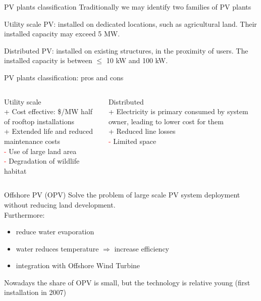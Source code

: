 \documentclass[aspectratio=169, 12pt]{beamer}
\begin{document}
\begin{frame}{PV plants classification}
  Traditionally we may identify two families of PV plants

  \textcolor{NTNUBlue}{Utility scale PV}: installed on dedicated locations, such as agricultural land. Their installed capacity may exceed 5 MW.

  \textcolor{NTNUBlue}{Distributed PV}: installed on existing structures, in the proximity of users. The installed capacity is between $\le$ 10 kW and 100 kW.

\end{frame}

\begin{frame}{PV plants classification: pros and cons}
  \begin{columns}
    \begin{column}{0.5\columnwidth}
      {\center \textcolor{NTNUBlue}{Utility scale}}\\
      \textcolor{NTNUgreen}{+} Cost effective: \$/MW half of rooftop installations\\
      \textcolor{NTNUgreen}{+} Extended life and reduced maintenance costs\\
      \textcolor{red}{-} Use of large land area\\
      \textcolor{red}{-} Degradation of wildlife habitat
    \end{column}
    \begin{column}{0.5\columnwidth}
      {\center \textcolor{NTNUBlue}{Distributed}}\\
      \textcolor{NTNUgreen}{+} Electricity is primary consumed by system owner, leading to lower cost for them\\
      \textcolor{NTNUgreen}{+} Reduced line losses\\
      \textcolor{red}{-} Limited space
    \end{column}
  \end{columns}
\end{frame}

\begin{frame}{Offshore PV (OPV)}
  Solve the problem of large scale PV system deployment without reducing land development. \\
  Furthermore: 
  \begin{itemize}
    \item reduce water evaporation
    \item water reduces temperature $\Rightarrow$ increase efficiency
    \item integration with Offshore Wind Turbine
  \end{itemize} 

  Nowadays the share of OPV is small, but the technology is relative young (first installation in 2007)
\end{frame}
\end{document}
